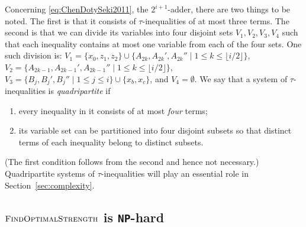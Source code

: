 \documentclass{article}
\theoremstyle{remark}
\theoremstyle{definition}
\newcommand{\findoptstrength}{\ensuremath{\mbox{\sc FindOptimalStrength}}}
\newcommand{\NP}{{\tt NP}}
\begin{document}
Concerning \eqref{eq:ChenDotySeki2011}, the $2^{i+1}$-adder, there are two things to be noted. 
The first is that it consists of $\tau$-inequalities of at most three terms. 
The second is that we can divide its variables into four disjoint sets $V_1, V_2, V_3, V_4$ such that each inequality contains at most one variable from each of the four sets. 
One such division is: $V_1 = \{x_0, z_1, z_2\} \cup \{A_{2k}, A_{2k}', A_{2k}'' \mid 1 \le k \le \lfloor i/2 \rfloor\}$, $V_2 = \{A_{2k-1}, A_{2k-1}', A_{2k-1}'' \mid 1 \le k \le \lfloor i/2 \rfloor\}$, $V_3 = \{B_j, B_j', B_j'' \mid 1 \le j \le i\} \cup \{x_b, x_c\}$, and $V_4 = \emptyset$. 
We say that a system of $\tau$-inequalities is {\it quadripartite} if %
\begin{enumerate}
\item	every inequality in it consists of at most {\it four} terms; 
\item	its variable set can be partitioned into four disjoint subsets so that distinct terms of each inequality belong to distinct subsets. 
\end{enumerate}
(The first condition follows from the second and hence not necessary.)
Quadripartite systems of $\tau$-inequalities will play an essential role in Section~\ref{sec:complexity}. 

	\subsection{$\findoptstrength$ is \NP-hard}
	\label{subsec:findoptstrength_NPhard}
\end{document}
